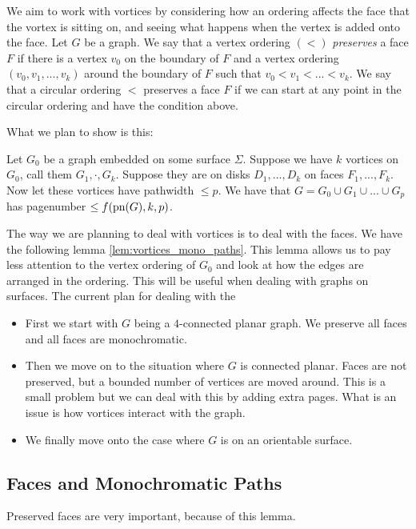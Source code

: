 We aim to work with vortices by considering how an ordering affects the face that the vortex is sitting on, and seeing what happens when the vertex is added onto the face.
Let $G$ be a graph. We say that a vertex ordering $(<)$ \textit{preserves} a face $F$ if there is a vertex $v_0$ on the boundary of $F$ and a vertex ordering $(v_0, v_1, ..., v_k)$ around the boundary of $F$ such that $v_0 < v_1 < ... < v_k$. We say that a circular ordering $<$ preserves a face $F$ if we can start at any point in the circular ordering and have the condition above. 

What we plan to show is this:
\begin{conjecture}
	Let $G_0$ be a graph embedded on some surface $\Sigma$. Suppose we have $k$ vortices on $G_0$, call them $G_1, \cdot , G_k$. Suppose they are on disks $D_1, ..., D_k$ on faces $F_1, ..., F_k$. Now let these vortices have pathwidth $\leq p$. 
	We have that $G = G_0 \cup G_1 \cup ... \cup G_p$ has pagenumber $\leq f(\text{pn}(G), k, p)$.
\end{conjecture}
The way we are planning to deal with vortices is to deal with the faces. We have the following lemma \cref{lem:vortices_mono_paths}. This lemma allows us to pay less attention to the vertex ordering of $G_0$ and look at how the edges are arranged in the ordering. This will be useful when dealing with graphs on surfaces.
The current plan for dealing with the 
\begin{itemize}
	\item First we start with $G$ being a $4$-connected planar graph. We preserve all faces and all faces are monochromatic.
	\item Then we move on to the situation where $G$ is connected planar. Faces are not preserved, but a bounded number of vertices are moved around. This is a small problem but we can deal with this by adding extra pages. What is an issue is how vortices interact with the graph. 
	\item We finally move onto the case where $G$ is on an orientable surface. 
\end{itemize}

\subsection{Faces and Monochromatic Paths}
Preserved faces are very important, because of this lemma.

